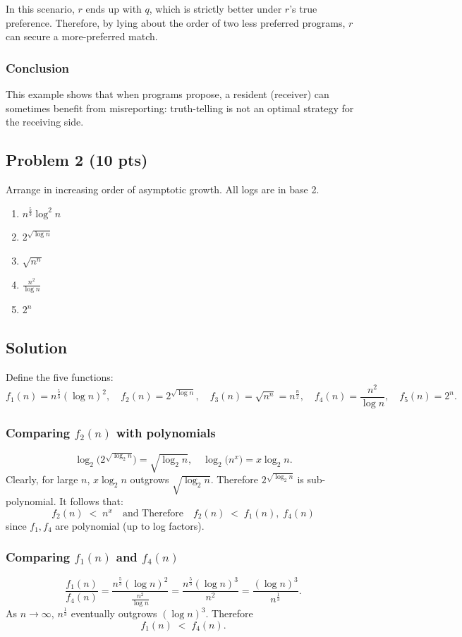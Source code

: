 \documentclass[12pt]{article}
\begin{document}
In this scenario, \(r\) ends up with \(q\), which is strictly better under \(r\)'s true preference. Therefore, by lying about the order of two less preferred programs, \(r\) can secure a more-preferred match.

\subsubsection*{Conclusion}
This example shows that when programs propose, a resident (receiver) can sometimes benefit from misreporting: truth-telling is not an optimal strategy for the receiving side. 

\subsection*{Problem 2 (10 pts)}
Arrange in increasing order of asymptotic growth. All logs are in base 2.

\begin{enumerate}
    \item \( n^{\frac{5}{3}} \log^2 n \)
    \item \( 2^{\sqrt{\log n}} \)
    \item \( \sqrt{n^n} \)
    \item \( \frac{n^2}{\log n} \)
    \item \( 2^n \)
\end{enumerate}

\subsection*{Solution}

Define the five functions:
\[
f_1(n) = n^{\tfrac{5}{3}} (\log n)^2, 
\quad
f_2(n) = 2^{\sqrt{\log n}}, 
\quad
f_3(n) = \sqrt{n^n} = n^{\tfrac{n}{2}}, 
\quad
f_4(n) = \frac{n^2}{\log n},
\quad
f_5(n) = 2^n.
\]

\subsubsection*{Comparing $f_2(n)$ with polynomials}
\[
\log_2\bigl(2^{\sqrt{\log_2 n}}\bigr) 
= \sqrt{\log_2 n}, 
\quad 
\log_2\bigl(n^x\bigr) 
= x \log_2 n.
\]
Clearly, for large \(n\), \(x \log_2 n\) outgrows \(\sqrt{\log_2 n}\). Therefore \(2^{\sqrt{\log_2 n}}\) is sub-polynomial. It follows that:
\[
f_2(n) \; < \; n^x 
\quad
\text{and Therefore}
\quad
f_2(n) \; < \; f_1(n),\; f_4(n)
\]
since \(f_1,f_4\) are polynomial (up to log factors).

\subsubsection*{Comparing $f_1(n)$ and $f_4(n)$}
\[
\frac{f_1(n)}{f_4(n)}
= \frac{n^{\tfrac{5}{3}}(\log n)^2}{\tfrac{n^2}{\log n}}
= \frac{n^{\tfrac{5}{3}}(\log n)^3}{n^2}
= \frac{(\log n)^3}{n^{\tfrac{1}{3}}}.
\]
As \(n\to\infty\), \(n^{\tfrac{1}{3}}\) eventually outgrows \((\log n)^3\). Therefore 
\[
f_1(n) \; < \; f_4(n).
\]
\end{document}
